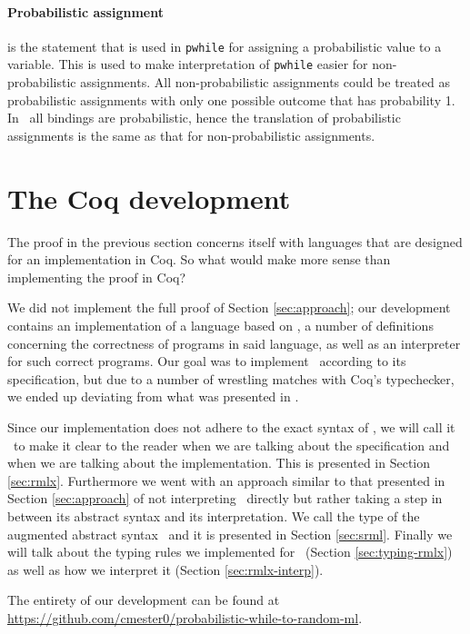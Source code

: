 \documentclass[11pt, leqno, titlepage]{article}
\theoremstyle{definition}
\begin{document}
\paragraph{Probabilistic assignment} is the statement that is used in \texttt{pwhile}
for assigning a probabilistic value to a variable. This is used to make
interpretation of \texttt{pwhile} easier for non-probabilistic assignments. All
non-probabilistic assignments could be treated as probabilistic assignments with
only one possible outcome that has probability 1. In \rml\ all bindings are
probabilistic, hence the translation of probabilistic assignments is the same as that
for non-probabilistic assignments. 

\section{The Coq development}\label{sec:contrib}
The proof in the previous section concerns itself with languages that are designed
for an implementation in Coq. So what would make more sense than implementing the
proof in Coq?

We did not implement the full proof of Section \ref{sec:approach}; our development
contains an implementation of a language based on \rml, a number of definitions
concerning the correctness of programs in said language, as well as an interpreter
for such correct programs. Our goal was to implement \rml\ according to its
specification, but due to a number of wrestling matches with Coq's typechecker, we
ended up deviating from what was presented in \cite{rml-paper}.

Since our implementation does not adhere to the exact syntax of \rml, we will call it
\rmlx\ to make it clear to the reader when we are talking about the specification
and when we are talking about the implementation. This is presented in Section
\ref{sec:rmlx}. Furthermore we went with an approach similar to that presented in
Section \ref{sec:approach} of not interpreting \rmlx\ directly but rather taking a
step in between its abstract syntax and its interpretation. We call the type of the
augmented abstract syntax \srml\ and it is presented in Section \ref{sec:srml}.
Finally we will talk about the typing rules we implemented for \rmlx\ (Section
\ref{sec:typing-rmlx}) as well as how we interpret it (Section
\ref{sec:rmlx-interp}). 

The entirety of our development can be found at \url{https://github.com/cmester0/probabilistic-while-to-random-ml}.
\end{document}
